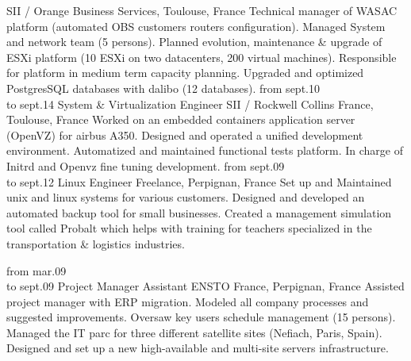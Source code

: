 \documentclass[]{friggeri-cv}
\begin{document}
\begin{entrylist}
        {SII / Orange Business Services, Toulouse, France}
        {Technical manager of WASAC platform (automated OBS customers routers configuration).
        Managed System and network team (5 persons).
	Planned evolution, maintenance \& upgrade of ESXi platform (10 ESXi on two datacenters,
        200 virtual machines). 
        Responsible for platform in medium term capacity planning.
        Upgraded and optimized PostgresSQL databases with dalibo (12 databases).
        }
    \entry
        {from sept.10\\to sept.14}
        {System \& Virtualization Engineer}
        {SII / Rockwell Collins France, Toulouse, France}
        {Worked on an embedded containers application server (OpenVZ) for airbus A350.
        Designed and operated a unified development environment.
        Automatized and maintained functional tests platform.
        In charge of Initrd and Openvz fine tuning development.
        }
    \entry
        {from sept.09\\to sept.12}
        {Linux Engineer}
        {Freelance, Perpignan, France}
        {Set up and Maintained unix and linux systems for various customers.
        Designed and developed an automated backup tool for small businesses.
	Created a management simulation tool called Probalt which helps with training
	for teachers specialized in the transportation \& logistics industries.
        }

\newpage
    \entry
        {from mar.09\\to sept.09}
        {Project Manager Assistant}
        {ENSTO France, Perpignan, France}
        {Assisted project manager with ERP migration.
        Modeled all company processes and suggested improvements.
        Oversaw key users schedule management (15 persons).
        Managed the IT parc for three different satellite sites (Nefiach, Paris, Spain).
        Designed and set up a new high-available and multi-site servers infrastructure.
        }
\end{entrylist}
\end{document}
